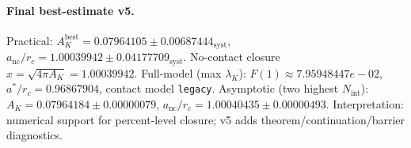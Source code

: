 \paragraph{Final best-estimate v5.}
Practical: $A_K^{\mathrm{best}} = 0.07964105 \pm 0.00687444_{\mathrm{syst}}$, $a_{\mathrm{nc}}/r_c = 1.00039942 \pm 0.04177709_{\mathrm{syst}}$.
No-contact closure $x = \sqrt{4\pi A_K} = 1.00039942$.
Full-model (max $\lambda_K$): $F(1) \approx 7.95948447e-02$, $a^*/r_c = 0.96867904$, contact model \texttt{legacy}.
Asymptotic (two highest $N_{\mathrm{int}}$): $A_K = 0.07964184 \pm 0.00000079$, $a_{\mathrm{nc}}/r_c = 1.00040435 \pm 0.00000493$.
Interpretation: numerical support for percent-level closure; v5 adds theorem/continuation/barrier diagnostics.
